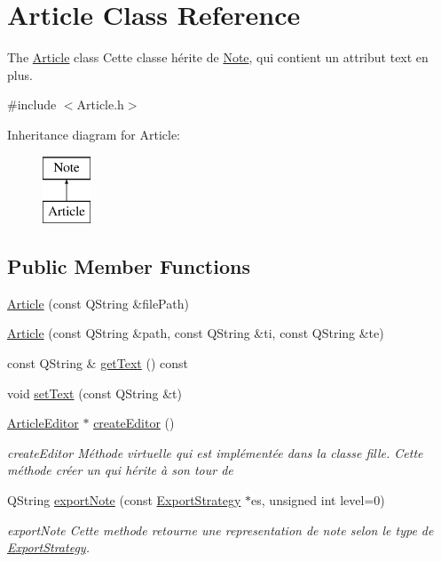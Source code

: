 \hypertarget{class_article}{\section{Article Class Reference}
\label{class_article}
}


The \hyperlink{class_article}{Article} class Cette classe hérite de \hyperlink{class_note}{Note}, qui contient un attribut text en plus.  




{\ttfamily \#include $<$Article.\-h$>$}

Inheritance diagram for Article\-:\begin{figure}[H]
\begin{center}
\leavevmode
\includegraphics[height=2.000000cm]{class_article}
\end{center}
\end{figure}
\subsection*{Public Member Functions}
\begin{DoxyCompactItemize}
\item 
\hyperlink{class_article_ae6df82ef9127b96f98537f40152b3527}{Article} (const Q\-String \&file\-Path)
\item 
\hyperlink{class_article_af1aa80a980a7c945904ba53b2adc9c6a}{Article} (const Q\-String \&path, const Q\-String \&ti, const Q\-String \&te)
\item 
const Q\-String \& \hyperlink{class_article_a2f7505b72f339bcbc2fa7c387ab681f4}{get\-Text} () const 
\item 
void \hyperlink{class_article_a7144942027b1761cfcbd21761dd5cee8}{set\-Text} (const Q\-String \&t)
\item 
\hyperlink{class_article_editor}{Article\-Editor} $\ast$ \hyperlink{class_article_a75e3d1ae4b9e426cb9cd9e81a4cf8319}{create\-Editor} ()
\begin{DoxyCompactList}\small\item\em create\-Editor Méthode virtuelle qui est implémentée dans la classe fille. Cette méthode créer un  qui hérite à son tour de  \end{DoxyCompactList}\item 
Q\-String \hyperlink{class_article_a7515405b3eb619d1a4bc28938036cf28}{export\-Note} (const \hyperlink{class_export_strategy}{Export\-Strategy} $\ast$es, unsigned int level=0)
\begin{DoxyCompactList}\small\item\em export\-Note Cette methode retourne une representation de note selon le type de \hyperlink{class_export_strategy}{Export\-Strategy}. \end{DoxyCompactList}\end{DoxyCompactItemize}
